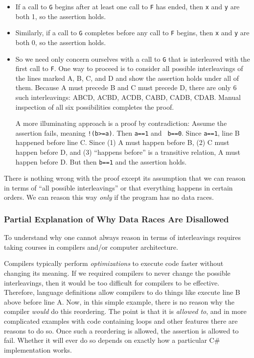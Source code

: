 \documentclass[10pt]{article}
\begin{document}
\begin{itemize}
\item If a call to {\tt G} begins after at least one call to {\tt F}
  has ended, then {\tt x} and {\tt y} are both 1, so the assertion
  holds.
\item Similarly, if a call to {\tt G} completes before any call to
  {\tt F} begins, then {\tt x} and {\tt y} are both 0, so the
  assertion holds.
\item So we need only concern ourselves with a call to {\tt G} that is
  interleaved with the first call to {\tt F}.  One way to proceed is
  to consider all possible interleavings of the lines marked A, B, C,
  and D and show the assertion holds under all of them.  Because A
  must precede B and C must precede D, there are only 6 such
  interleavings: ABCD, ACBD, ACDB, CABD, CADB, CDAB.  Manual
  inspection of all six possibilities completes the proof.  
  
  A more illuminating approach is a proof by contradiction: Assume the
  assertion fails, meaning {\tt !(b>=a)}.  Then {\tt a==1} and {\tt
    b==0}.  Since {\tt a==1}, line B happened before line C\@.  Since
  (1) A must happen before B, (2) C must happen before D, and (3) ``happens
  before'' is a transitive relation, A must happen before D\@.  But
  then {\tt b==1} and the assertion holds.
\end{itemize}

There is nothing wrong with the proof except its assumption that we can
reason in terms of ``all possible interleavings'' or that everything
happens in certain orders.  We can reason this way \emph{only} if the
program has no data races.

\subsubsection{Partial Explanation of Why Data Races Are Disallowed}
\label{sec:data-race-why}

To understand why one cannot always reason in terms of interleavings
requires taking courses in compilers and/or computer architecture.

Compilers typically perform \emph{optimizations} to execute code
faster without changing its meaning.  If we required compilers to
never change the possible interleavings, then it would be too
difficult for compilers to be effective.  Therefore, language
definitions allow compilers to do things like execute line B above
before line A.  Now, in this simple example, there is no reason why
the compiler \emph{would} do this reordering.  The point is that it is
\emph{allowed to}, and in more complicated examples with code
containing loops and other features there are reasons to do so.  Once
such a reordering is allowed, the assertion is allowed to fail.
Whether it will ever do so depends on exactly how a particular C\#
implementation works.
\end{document}

